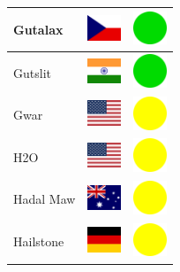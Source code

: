 \documentclass[12pt, a4paper, twoside]{report}
\begin{document}
\begin{center}
\begin{longtable}{|p{5cm}|p{2cm}|p{2cm}|}
Gutalax & \includegraphics[width=1cm]{4x3/cz} & \includegraphics[width=1cm]{likes/y} \\ \hline
Gutslit & \includegraphics[width=1cm]{4x3/in} & \includegraphics[width=1cm]{likes/y} \\ \hline
Gwar & \includegraphics[width=1cm]{4x3/us} & \includegraphics[width=1cm]{likes/m} \\ \hline
H2O & \includegraphics[width=1cm]{4x3/us} & \includegraphics[width=1cm]{likes/m} \\ \hline
Hadal Maw & \includegraphics[width=1cm]{4x3/au} & \includegraphics[width=1cm]{likes/m} \\ \hline
Hailstone & \includegraphics[width=1cm]{4x3/de} & \includegraphics[width=1cm]{likes/m} \\ \hline

\end{longtable}
\end{center}
\end{document}
